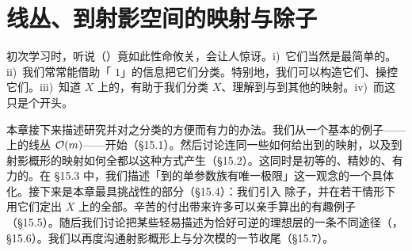 
\chapter{线丛、到射影空间的映射与除子}
\label{ch:line-bundles-divisors}

初次学习\trAlgebraicGeometry{}时，听说\trLineBundle（\trInvertibleSheaf）竟如此性命攸关，会让人惊讶。i)~它们当然是最简单的\trVectorBundle。ii)~我们常常能借助「\trCodimension{} $1$」的信息把它们分类。特别地，我们可以构造它们、操控它们。iii)~知道\trVariety{} $X$ 上的\trLineBundle，有助于我们分类 $X$、理解到\trProjectiveSpace{}与到其他\trVariety{}的映射。iv)~而这只是个开头。

本章接下来描述研究\trLineBundle{}并对之分类的方便而有力的办法。我们从一个基本的例子——\trProjectiveSpace{}上的线丛 $\mathcal{O}(m)$——开始（\S15.1）。然后讨论\trLineBundle{}连同一些\trSection{}如何给出到\trProjectiveSpace{}的映射，以及到射影概形的映射如何全都以这种方式产生（\S15.2）。这同时是初等的、精妙的、有力的。在 \S15.3 中，我们描述「到\trProjectiveSpace{}的单参数族有唯一极限」这一观念的一个具体化。接下来是本章最具挑战性的部分（\S15.4）：我们引入 \trWeil{}除子，并在若干情形下用它们定出 $X$ 上的全部\trLineBundle。辛苦的付出带来许多可以亲手算出的有趣例子（\S15.5）。随后我们讨论把某些\trLineBundle{}轻易描述为恰好可逆的理想层的一条不同途径（\trEffectiveCartierDivisor，\S15.6）。我们以再度沟通射影概形上\trQCSheaf{}与分次模的一节收尾（\S15.7）。








